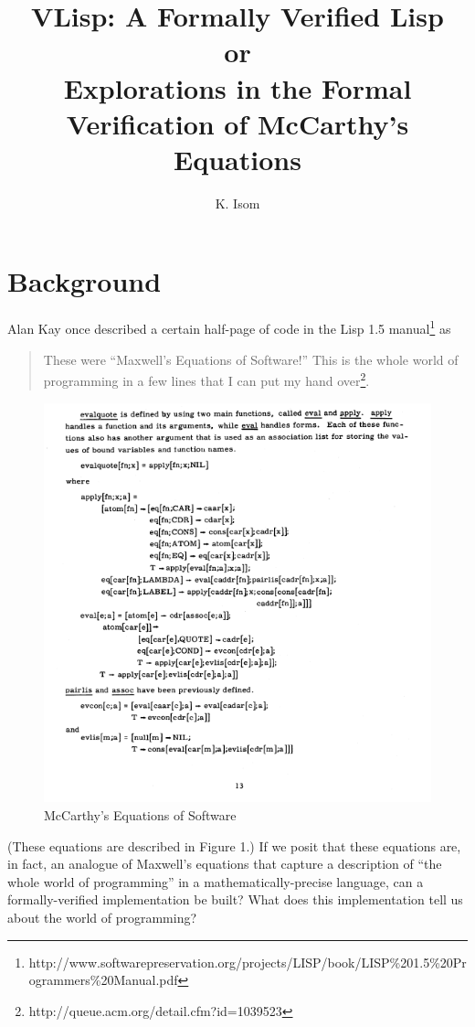 \documentclass[10pt]{article}
\title {VLisp: A Formally Verified Lisp\\or\\Explorations in the Formal Verification of McCarthy's Equations}
\author{K. Isom}
\begin{document}
\maketitle

\section{Background}

Alan Kay once described a certain half-page of code in the Lisp 1.5
manual\footnote{http://www.softwarepreservation.org/projects/LISP/book/LISP\%201.5\%20Programmers\%20Manual.pdf}
as 
\begin{quote}
These were ``Maxwell’s Equations of Software!'' This is the whole world of programming in a few lines that I can put my hand over\footnote{http://queue.acm.org/detail.cfm?id=1039523}.
\end{quote}

\begin{figure}[h]
\includegraphics{Lisp_Maxwells_Equations}
\caption{McCarthy's Equations of Software}
\end{figure}

(These equations are described in Figure 1.) If we posit that these
equations are, in fact, an analogue of Maxwell's equations that
capture a description of ``the whole world of programming'' in a
mathematically-precise language, can a formally-verified
implementation be built? What does this implementation tell us about
the world of programming?
\end{document}
